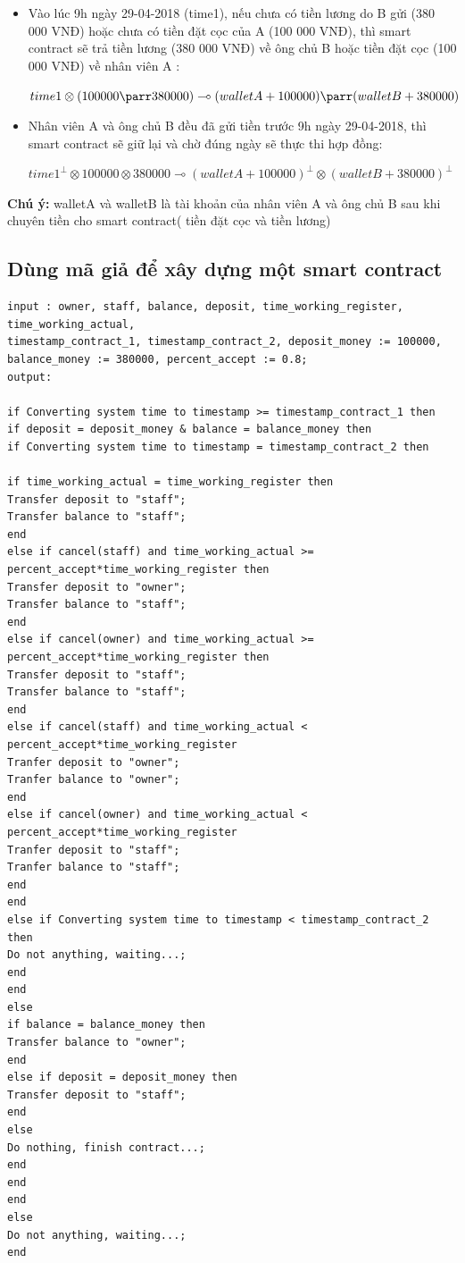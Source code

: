 \documentclass[12pt,a4paper,oneside]{article}
\begin{document}
\begin{itemize}
	\item Vào lúc 9h ngày 29-04-2018 (time1), nếu chưa có tiền lương do B gửi (380 000 VNĐ) hoặc chưa có tiền đặt cọc của A (100 000 VNĐ), thì smart contract sẽ trả tiền lương (380 000 VNĐ) về ông chủ B hoặc  tiền đặt cọc (100 000 VNĐ) về nhân viên A : 
	\begin{center}
		$time1 \otimes (100 000 \parr 380 000) \multimap  ( walletA + 100 000) \parr (walletB + 380 000)$
	\end{center}
	
	\item Nhân viên A và ông chủ B đều đã gửi tiền trước 9h ngày 29-04-2018, thì smart contract sẽ giữ lại và chờ đúng ngày sẽ thực thi hợp đồng:
	\begin{center}
		$time1^\bot \otimes 100 000 \otimes 380 000 \multimap  ( walletA + 100 000)^\bot \otimes (walletB + 380 000)^\bot$
	\end{center}
	
\end{itemize}
\textbf{Chú ý: }walletA và walletB là tài khoản của nhân viên A và ông chủ B sau khi chuyên tiền cho smart contract( tiền đặt cọc và tiền lương)
\subsection{Dùng mã giả để xây dựng một smart contract}

\begin{lstlisting}
input : owner, staff, balance, deposit, time_working_register, time_working_actual, 
timestamp_contract_1, timestamp_contract_2, deposit_money := 100000,
balance_money := 380000, percent_accept := 0.8;
output:

if Converting system time to timestamp >= timestamp_contract_1 then
if deposit = deposit_money & balance = balance_money then
if Converting system time to timestamp = timestamp_contract_2 then

if time_working_actual = time_working_register then
Transfer deposit to "staff";
Transfer balance to "staff";
end
else if cancel(staff) and time_working_actual >= percent_accept*time_working_register then
Transfer deposit to "owner";
Transfer balance to "staff";
end
else if cancel(owner) and time_working_actual >= percent_accept*time_working_register then
Transfer deposit to "staff";
Transfer balance to "staff";
end
else if cancel(staff) and time_working_actual < percent_accept*time_working_register
Tranfer deposit to "owner";
Tranfer balance to "owner";
end
else if cancel(owner) and time_working_actual < percent_accept*time_working_register
Tranfer deposit to "staff";
Tranfer balance to "staff";
end
end
else if Converting system time to timestamp < timestamp_contract_2 then
Do not anything, waiting...;
end
end
else
if balance = balance_money then
Transfer balance to "owner";
end
else if deposit = deposit_money then
Transfer deposit to "staff";
end
else
Do nothing, finish contract...;
end
end
end
else
Do not anything, waiting...;
end
\end{lstlisting}
\end{document}
